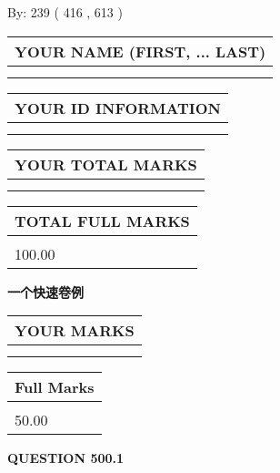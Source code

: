 \documentclass{ctexart}
\begin{document}
   
\hspace{1.0in} By: 
 239 ( 416 ,  613 )
   
   
   
   
\newpage 
\setcounter{page}{ 
   500001 } 
   
   
   
   
\noindent\begin{tabular}{|l|}
\hline
YOUR NAME (FIRST, ... LAST)  \\
\hline
 \\ 
 \\ 
\hline
\end{tabular}
\hspace{0.05in} \begin{tabular}{|l|}
\hline
 YOUR   ID   INFORMATION  \\
\hline
 \\ 
 \\ 
\hline
\end{tabular}
   
   
\vspace{0.2in}\noindent\begin{tabular}{|l|}
\hline
YOUR TOTAL MARKS  \\
\hline
 \\ 
 \\ 
\hline
\end{tabular}
\hspace{0.05in} \begin{tabular}{|l|}
\hline
TOTAL FULL MARKS  \\
\hline
 \\ 
100.00 \\
\hline
\end{tabular}
   
   
 \vspace{0.2in}
{\LARGE {\textbf{ 一个快速卷例}}}
   
   
  
\vspace{0.2in}
  
\noindent\begin{tabular}{|l|}
\hline
 YOUR MARKS  \\
\hline
 \\ 
 \\ 
\hline
\end{tabular}
\hspace{0.05in} \begin{tabular}{|l|}
\hline
 Full Marks  \\
\hline
 \\ 
50.00 \\
\hline
\end{tabular}
{\textbf{\Large{QUESTION
500.1 
}}}
  
\end{document}
